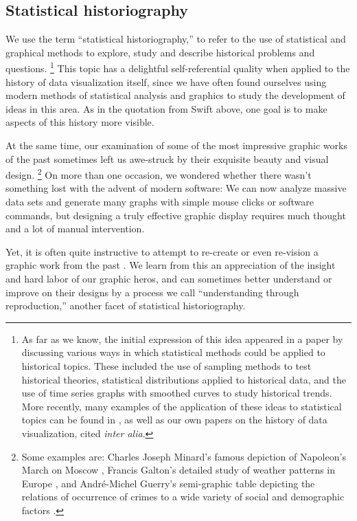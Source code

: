 \documentclass[11pt]{article}
\begin{document}
\subsection{Statistical historiography}\label{sec:stathist}
We use the term ``statistical historiography,''
to refer to the use of statistical and graphical methods to
explore, study and describe historical problems and questions.%
\footnote{
  As far as we know, the initial expression of this idea appeared in a paper by
  \citet{Rubin:1943} discussing various ways in which statistical methods could be applied
  to historical topics.  These included the use of sampling methods to test historical theories,
  statistical distributions applied to historical data, and the use of
  time series graphs with smoothed curves to study historical trends.
  More recently, many examples of the application of these ideas to statistical topics
  can be found in \citet{Stigler:1986,Stigler:1999}, as well as our own papers
  on the history of data visualization,
  cited \emph{inter alia}.
}
This topic has a delightful self-referential quality when applied to the history of data visualization itself,
since we have often found ourselves using modern methods of statistical analysis and graphics to study
the development of ideas in this area. As in the quotation from Swift above, one goal is to make aspects
of this history more visible.

At the same time, our examination of some of the most
impressive graphic works of the past sometimes left us awe-struck by their exquisite
beauty and visual design.%
\footnote{ Some examples are:
Charles Joseph Minard's famous depiction of Napoleon's March on Moscow \citep{Friendly:02:Minard},
Francis Galton's detailed study of weather patterns in Europe \citep[see:][]{Friendly:2008:golden},
and Andr{\'e}-Michel Guerry's \citep[Plate 17]{Guerry:1864}
semi-graphic table depicting the relations of occurrence of
crimes to a wide variety of social and demographic factors \citep[see:][]{Friendly:2007:guerry}.
}
On more than one occasion, we wondered whether there wasn't something lost with the advent of modern
software: We can now analyze massive data sets and generate many graphs with simple mouse clicks
or software commands, but designing a truly effective graphic display requires much thought and
a lot of manual intervention. 

Yet, it is often quite instructive to attempt to re-create or
even re-vision a graphic work from the past \citep{Friendly:02:Minard}. We learn from
this an appreciation of the insight and hard labor of our graphic heros, and
can sometimes better understand or improve on their designs by a process we call
``understanding through reproduction,'' another facet of statistical historiography.
\end{document}
